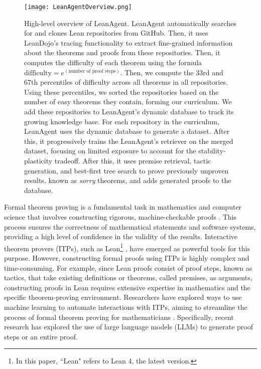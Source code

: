 \documentclass{article} %
\begin{document}
\begin{figure}[!ht]
    \centering
    \texttt{[image: LeanAgentOverview.png]}
    \caption{High-level overview of LeanAgent. LeanAgent automatically searches for and clones Lean repositories from GitHub. Then, it uses LeanDojo's \citep{yangLeanDojoTheoremProving2023} tracing functionality to extract fine-grained information about the theorems and proofs from these repositories. Then, it computes the difficulty of each theorem using the formula $\text{difficulty} = e^{(\text{number of proof steps})}$. Then, we compute the 33rd and 67th percentiles of difficulty across all theorems in all repositories. Using these percentiles, we sorted the repositories based on the number of easy theorems they contain, forming our curriculum. We add these repositories to LeanAgent's dynamic database to track its growing knowledge base. For each repository in the curriculum, LeanAgent uses the dynamic database to generate a dataset. After this, it progressively trains the LeanAgent's retriever on the merged dataset, focusing on limited exposure to account for the stability-plasticity tradeoff. After this, it uses premise retrieval, tactic generation, and best-first tree search to prove previously unproven results, known as \textit{sorry} theorems, and adds generated proofs to the database.}
    \label{fig:overview}
\end{figure}

Formal theorem proving is a fundamental task in mathematics and computer science that involves constructing rigorous, machine-checkable proofs \citep{imperialcollegefacultyofnaturalsciencesFutureMathematicsProfessor2019}. This process ensures the correctness of mathematical statements and software systems, providing a high level of confidence in the validity of the results. Interactive theorem provers (ITPs), such as Lean\footnote{In this paper, ``Lean" refers to Lean 4, the latest version.} \citep{demouraLeanTheoremProver2015}, have emerged as powerful tools for this purpose. However, constructing formal proofs using ITPs is highly complex and time-consuming. For example, since Lean proofs consist of proof steps, known as tactics, that take existing definitions or theorems, called premises, as arguments, constructing proofs in Lean requires extensive expertise in mathematics and the specific theorem-proving environment. Researchers have explored ways to use machine learning to automate interactions with ITPs, aiming to streamline the process of formal theorem proving for mathematicians \citep{yangLearningProveTheorems2019}. Specifically, recent research has explored the use of large language models (LLMs) to generate proof steps or an entire proof.
\end{document}
